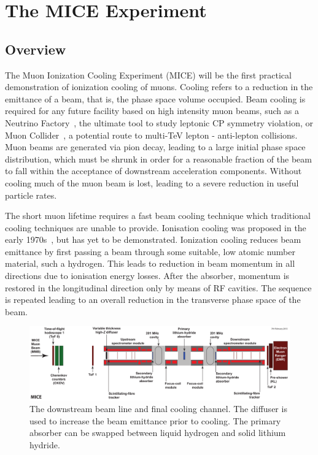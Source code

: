 \section{The MICE Experiment}
\label{sec:MICE}
  \subsection{Overview}
  \label{subsec:Overview}
  The Muon Ionization Cooling Experiment (MICE) will be the first practical demonstration of ionization cooling of muons. Cooling refers to a reduction in the emittance of a beam, that is, the phase space volume occupied. Beam cooling is required for any future facility based on high intensity muon beams, such as a Neutrino Factory~\cite{ISS-Physics}, the ultimate tool to study leptonic CP symmetry violation, or Muon Collider~\cite{MC_Overview}, a potential route to multi-TeV lepton - anti-lepton collisions. Muon beams are generated via pion decay, leading to a large initial phase space distribution, which must be shrunk in order for a reasonable fraction of the beam to fall within the acceptance of downstream acceleration components. Without cooling much of the muon beam is lost, leading to a severe reduction in useful particle rates.   

  The short muon lifetime requires a fast beam cooling technique which traditional cooling techniques are unable to provide.  Ionisation cooling was proposed in the early 1970s~\cite{Skrinsky, Neuffer}, but has yet to be demonstrated.  Ionization cooling reduces beam emittance by first passing a beam through some suitable, low atomic number material, such a hydrogen.  This leads to reduction in beam momentum in all directions due to ionisation energy losses.  After the absorber, momentum is restored in the longitudinal direction only by means of RF cavities.  The sequence is repeated leading to an overall reduction in the transverse phase space of the beam.

  \begin{figure}[bht]
    \begin{center}
      \includegraphics[width=1.0\linewidth]{01-MICE/Cooling-demo-labels.pdf}
      \caption{\label{fig:CoolingChannel} The downstream beam line and final cooling channel. The diffuser is used to increase the beam emittance prior to cooling. The primary absorber can be swapped between liquid hydrogen and solid lithium hydride.}
    \end{center}
  \end{figure}

